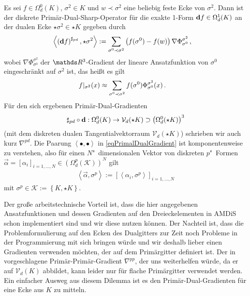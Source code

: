  \begin{definition}
    Es sei \( f\in\Omega^{0}_{d}(K) \), \( \sigma^{2}\in K \) und \( w\prec \sigma^{2} \) eine beliebig feste Ecke von \( \sigma^{2} \).
    Dann ist der diskrete Primär-Dual-Sharp-Operator für die exakte 1-Form \( \mathbf{d} f \in \Omega^{1}_{d}(K) \) an der dualen Ecke
    \( \star\sigma^{2}\in \star K \) gegeben durch
    \begin{align}
      \label{eqPrimalDualGradient}
      \left\langle \left( \mathbf{d} f \right)^{\sharp_{pd}} , \star\sigma^{2}\right\rangle
          &:= \sum_{\sigma^{0}\prec\sigma^{2}} \left( f(\sigma^{0}) - f(w) \right) \nabla\Phi_{\sigma^{0}}^{\sigma^{2}} \,\text{,}
    \end{align}
    wobei \( \nabla\Phi_{\sigma^{0}}^{\sigma^{2}} \) der \( \R^{3} \)-Gradient 
    der lineare Ansatzfunktion von \( \sigma^{0} \) eingeschränkt auf \( \sigma^{2} \) ist,
    das heißt es gilt
    \begin{align}
      f|_{\sigma^{2}}(x) &\approx \sum_{\sigma^{0}\prec\sigma^{2}} f(\sigma^{0}) \Phi_{\sigma^{0}}^{\sigma^{2}}(x) \,\text{.}
    \end{align}
    Für den sich ergebenen Primär-Dual-Gradienten
    \begin{align}
      \sharp_{pd}\circ\mathbf{d}: \Omega^{0}_{d}(K) \rightarrow \mathcal{V}_{d}(\star K) \supset \left( \Omega^{0}_{d}(\star K) \right)^{3}
    \end{align}
    (mit dem diskreten dualen Tangentialvektorraum \( \mathcal{V}_{d}(\star K) \)) schrieben wir auch kurz \( \nabla^{pd} \).
    Die Paarung \( \left\langle \bullet, \bullet  \right\rangle \) in \eqref{eqPrimalDualGradient} ist komponentenweise zu verstehen, also
    für einen \( N \)"~di\-men\-si\-o\-nalen Vektor von diskreten \( p \)"~Formen 
    \( \vec\alpha=\left[ \alpha_{i} \right]_{i=1,\ldots,N}\in\left(\Omega^{p}_{d}(\mathcal{K})\right)^{N} \) 
    gilt
    \begin{align}
      \left\langle \vec\alpha, \sigma^{p} \right\rangle 
        := \left[ \left\langle \alpha_{i} , \sigma^{p} \right\rangle \right]_{i=1,\ldots,N}
    \end{align}
    mit \( \sigma^{p} \in \mathcal{K}:=\left\{ K, \star K \right\} \).
  \end{definition}
  Der große arbeitstechnische Vorteil ist, dass die hier angegebenen Ansatzfunktionen und dessen Gradienten auf den Dreieckelementen in AMDiS
  schon implementiert sind und wir diese nutzen können.
  Der Nachteil ist, dass die Problemformulierung auf den Ecken des Dualgitters zur Zeit noch Probleme in der Programmierung mit sich
  bringen würde und wir deshalb lieber einen Gradienten verwenden möchten, der auf dem Primärgitter
  definiert ist.
  Der in \cite{hirani} vorgeschlagene Primär-Primär-Gradient \( \nabla^{pp} \), der uns weiterhelfen würde, da er auf \( \mathcal{V}_{d}(K) \)
  abbildet, kann leider nur für flache Primärgitter verwendet werden.
  Ein einfacher Ausweg aus diesem Dilemma ist es den Primär-Dual-Gradienten für eine Ecke aus \( K \) zu mitteln.

